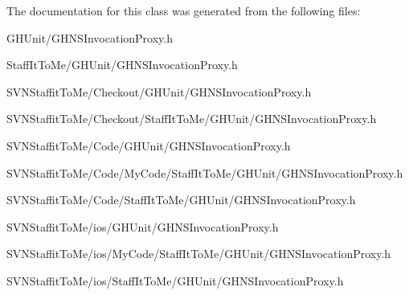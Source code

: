 \-The documentation for this class was generated from the following files\-:\begin{DoxyCompactItemize}
\item 
\-G\-H\-Unit/\-G\-H\-N\-S\-Invocation\-Proxy.\-h\item 
\-Staff\-It\-To\-Me/\-G\-H\-Unit/\-G\-H\-N\-S\-Invocation\-Proxy.\-h\item 
\-S\-V\-N\-Staffit\-To\-Me/\-Checkout/\-G\-H\-Unit/\-G\-H\-N\-S\-Invocation\-Proxy.\-h\item 
\-S\-V\-N\-Staffit\-To\-Me/\-Checkout/\-Staff\-It\-To\-Me/\-G\-H\-Unit/\-G\-H\-N\-S\-Invocation\-Proxy.\-h\item 
\-S\-V\-N\-Staffit\-To\-Me/\-Code/\-G\-H\-Unit/\-G\-H\-N\-S\-Invocation\-Proxy.\-h\item 
\-S\-V\-N\-Staffit\-To\-Me/\-Code/\-My\-Code/\-Staff\-It\-To\-Me/\-G\-H\-Unit/\-G\-H\-N\-S\-Invocation\-Proxy.\-h\item 
\-S\-V\-N\-Staffit\-To\-Me/\-Code/\-Staff\-It\-To\-Me/\-G\-H\-Unit/\-G\-H\-N\-S\-Invocation\-Proxy.\-h\item 
\-S\-V\-N\-Staffit\-To\-Me/ios/\-G\-H\-Unit/\-G\-H\-N\-S\-Invocation\-Proxy.\-h\item 
\-S\-V\-N\-Staffit\-To\-Me/ios/\-My\-Code/\-Staff\-It\-To\-Me/\-G\-H\-Unit/\-G\-H\-N\-S\-Invocation\-Proxy.\-h\item 
\-S\-V\-N\-Staffit\-To\-Me/ios/\-Staff\-It\-To\-Me/\-G\-H\-Unit/\-G\-H\-N\-S\-Invocation\-Proxy.\-h\end{DoxyCompactItemize}
